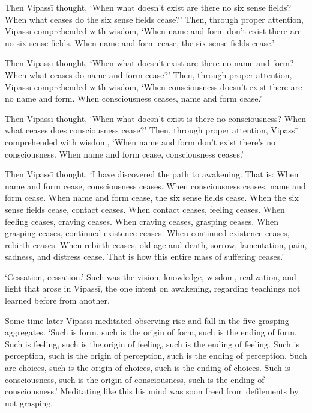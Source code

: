 \documentclass[12pt,openany]{book}%
\begin{document}
Then \textsanskrit{Vipassī} thought, ‘When what doesn’t exist are there no six sense fields? When what ceases do the six sense fields cease?’ Then, through proper attention, \textsanskrit{Vipassī} comprehended with wisdom, ‘When name and form don’t exist there are no six sense fields. When name and form cease, the six sense fields cease.’ 

Then \textsanskrit{Vipassī} thought, ‘When what doesn’t exist are there no name and form? When what ceases do name and form cease?’ Then, through proper attention, \textsanskrit{Vipassī} comprehended with wisdom, ‘When consciousness doesn’t exist there are no name and form. When consciousness ceases, name and form cease.’ 

Then \textsanskrit{Vipassī} thought, ‘When what doesn’t exist is there no consciousness? When what ceases does consciousness cease?’ Then, through proper attention, \textsanskrit{Vipassī} comprehended with wisdom, ‘When name and form don’t exist there’s no consciousness. When name and form cease, consciousness ceases.’ 

Then \textsanskrit{Vipassī} thought, ‘I have discovered the path to awakening. That is: When name and form cease, consciousness ceases. When consciousness ceases, name and form cease. When name and form cease, the six sense fields cease. When the six sense fields cease, contact ceases. When contact ceases, feeling ceases. When feeling ceases, craving ceases. When craving ceases, grasping ceases. When grasping ceases, continued existence ceases. When continued existence ceases, rebirth ceases. When rebirth ceases, old age and death, sorrow, lamentation, pain, sadness, and distress cease. That is how this entire mass of suffering ceases.’ 

‘Cessation, cessation.’ Such was the vision, knowledge, wisdom, realization, and light that arose in \textsanskrit{Vipassī}, the one intent on awakening, regarding teachings not learned before from another. 

Some time later \textsanskrit{Vipassī} meditated observing rise and fall in the five grasping aggregates. ‘Such is form, such is the origin of form, such is the ending of form. Such is feeling, such is the origin of feeling, such is the ending of feeling. Such is perception, such is the origin of perception, such is the ending of perception. Such are choices, such is the origin of choices, such is the ending of choices. Such is consciousness, such is the origin of consciousness, such is the ending of consciousness.’ Meditating like this his mind was soon freed from defilements by not grasping. 
\end{document}
